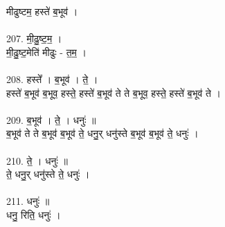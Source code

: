मीढुष्टम॒ हस्ते॑ ब॒भूव॑ ।\\
\\
207. मी॒ढु॒ष्ट॒म॒ ।\\
मी॒ढु॒ष्ट॒मेति॑ मीढुः - त॒म॒ ।\\
\\
208. हस्ते᳚ । ब॒भूव॑ । ते॒ ।\\
हस्ते॑ ब॒भूव॑ ब॒भूव॒ हस्ते॒ हस्ते॑ ब॒भूव॑ ते ते ब॒भूव॒ हस्ते॒ हस्ते॑ ब॒भूव॑ ते ।\\
\\
209. ब॒भूव॑ । ते॒ । धनुः॑ ॥\\
ब॒भूव॑ ते ते ब॒भूव॑ ब॒भूव॑ ते॒ धनु॒र् धनु॑स्ते ब॒भूव॑ ब॒भूव॑ ते॒ धनुः॑ ।\\
\\
210. ते॒ । धनुः॑ ॥\\
ते॒ धनु॒र् धनु॑स्ते ते॒ धनुः॑ ।\\
\\
211. धनुः॑ ॥\\
धनु॒ रिति॒ धनुः॑ ।\\
\\
